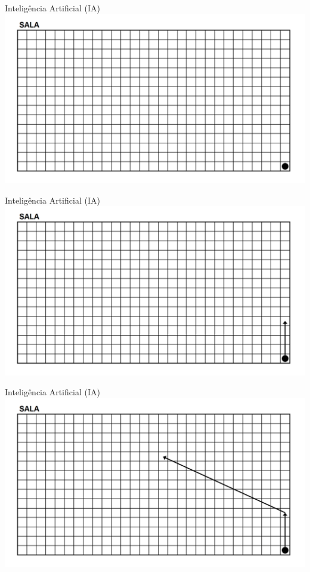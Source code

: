 \documentclass{libs/ufc_format}
\begin{document}
\begin{frame}{Inteligência Artificial (IA)}
    \includegraphics[width=\textwidth]{media/SALA_dividido}
\end{frame}

\begin{frame}{Inteligência Artificial (IA)}
    \includegraphics[width=\textwidth]{media/SALA_caminho01_01}
\end{frame}

\begin{frame}{Inteligência Artificial (IA)}
    \includegraphics[width=\textwidth]{media/SALA_caminho01_02}
\end{frame}
\end{document}
